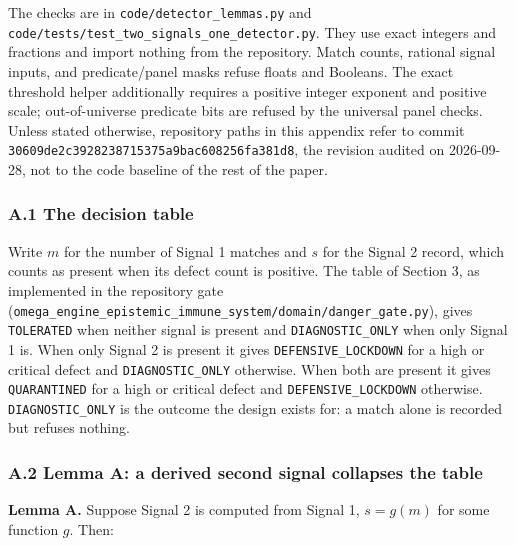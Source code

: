 \documentclass[
  11pt,
]{article}
\newcommand{\passthrough}[1]{#1}
\begin{document}
The checks are in \texttt{\nolinkurl{code/detector_lemmas.py}} and
\texttt{\nolinkurl{code/tests/test_two_signals_one_detector.py}}.
They use exact integers and fractions and import nothing from the
repository. Match counts, rational signal inputs, and predicate/panel
masks refuse floats and Booleans. The exact threshold helper
additionally requires a positive integer exponent and positive scale;
out-of-universe predicate bits are refused by the universal panel
checks. Unless stated otherwise, repository paths in this appendix refer
to commit
\texttt{\nolinkurl{30609de2c3928238715375a9bac608256fa381d8}}, the
revision audited on 2026-09-28, not to the code baseline of the rest of
the paper.

\hypertarget{a.1-the-decision-table}{%
\subsubsection{A.1 The decision table}\label{a.1-the-decision-table}}

Write \(m\) for the number of Signal 1 matches and \(s\) for the Signal
2 record, which counts as present when its defect count is positive. The
table of Section 3, as implemented in the repository gate
(\texttt{\nolinkurl{omega_engine_epistemic_immune_system/domain/danger_gate.py}}),
gives \passthrough{\lstinline!TOLERATED!} when neither signal is present
and \texttt{\nolinkurl{DIAGNOSTIC_ONLY}} when only Signal 1 is.
When only Signal 2 is present it gives
\texttt{\nolinkurl{DEFENSIVE_LOCKDOWN}} for a high or critical
defect and \texttt{\nolinkurl{DIAGNOSTIC_ONLY}} otherwise. When
both are present it gives \passthrough{\lstinline!QUARANTINED!} for a
high or critical defect and
\texttt{\nolinkurl{DEFENSIVE_LOCKDOWN}} otherwise.
\texttt{\nolinkurl{DIAGNOSTIC_ONLY}} is the outcome the design
exists for: a match alone is recorded but refuses nothing.

\hypertarget{a.2-lemma-a-a-derived-second-signal-collapses-the-table}{%
\subsubsection{A.2 Lemma A: a derived second signal collapses the
table}\label{a.2-lemma-a-a-derived-second-signal-collapses-the-table}}

\textbf{Lemma A.} Suppose Signal 2 is computed from Signal 1,
\(s = g(m)\) for some function \(g\). Then:
\end{document}
